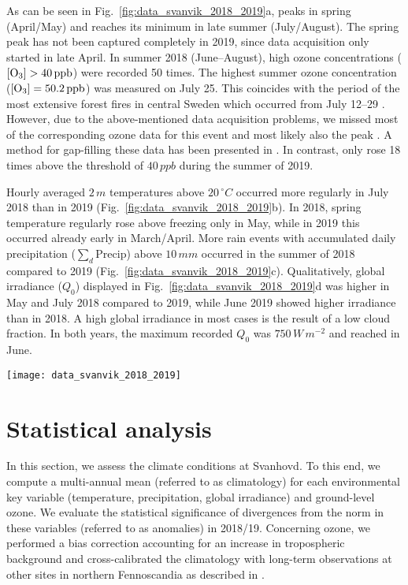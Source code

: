 \documentclass[bg, manuscript]{copernicus}
\begin{document}
As can be seen in Fig.~\ref{fig:data_svanvik_2018_2019}a, \chem{[O_3]} peaks in spring (April/May) and reaches its minimum in late summer (July/August). The spring peak has not been captured completely in 2019, since data acquisition only started in late April. In summer 2018 (June--August), high ozone concentrations ($\chem{[O_3]} > 40\,\unit{ppb}$) were recorded 50 times. The highest summer ozone concentration ($\chem{[O_3]} = 50.2\,\unit{ppb}$) was measured on July 25. This coincides with the period of the most extensive forest fires in central Sweden which occurred from July 12--29 \citep{SOU2019}. However, due to the above-mentioned data acquisition problems, we missed most of the corresponding ozone data for this event and most likely also the peak \chem{[O_3]}. A method for gap-filling these data has been presented in \citet{ACPD:Falk2021}. In contrast, \chem{[O_3]} only rose 18 times above the threshold of $40\,\unit{ppb}$ during the summer of 2019. 

Hourly averaged $2\,\unit{m}$ temperatures above $20\,\unit{^\circ C}$ occurred more regularly in July 2018 than in 2019 (Fig.~\ref{fig:data_svanvik_2018_2019}b). In 2018, spring temperature regularly rose above freezing only in May, while in 2019 this occurred already early in March/April.
More rain events with accumulated daily precipitation ($\sum_d \mathrm{Precip}$) above $10\,\unit{mm}$ occurred in the summer of 2018 compared to 2019 (Fig.~\ref{fig:data_svanvik_2018_2019}c).
Qualitatively, global irradiance ($Q_0$) displayed in Fig.~\ref{fig:data_svanvik_2018_2019}d was higher in May and July 2018 compared to 2019, while June 2019 showed higher irradiance than in 2018. A high global irradiance in most cases is the result of a low cloud fraction. In both years, the maximum recorded $Q_0$ was $750\,\unit{W\,m^{-2}}$ and reached in June.

\begin{figure*}[t]
  \texttt{[image: data\_svanvik\_2018\_2019]}
  \caption{Observational data from atmospheric monitoring at Svanhovd in 2018/19. The hatched areas indicate periods without ozone monitoring data. (a) Hourly averaged \chem{[O_3]}; (b) hourly averaged temperature; (c) daily accumulated precipitation; (d) hourly averaged global irradiance.}
  \label{fig:data_svanvik_2018_2019}
\end{figure*}

\section{Statistical analysis}
\label{sec:stats}
In this section, we assess the climate conditions at Svanhovd. To this end, we compute a multi-annual mean (referred to as climatology) for each environmental key variable (temperature, precipitation, global irradiance) and ground-level ozone. We evaluate the statistical significance of divergences from the norm in these variables (referred to as anomalies) in 2018/19. Concerning ozone, we performed a bias correction accounting for an increase in tropospheric background \chem{[O_3]} and cross-calibrated the climatology with long-term observations at other sites in northern Fennoscandia as described in \citet{ACPD:Falk2021}.
\end{document}
